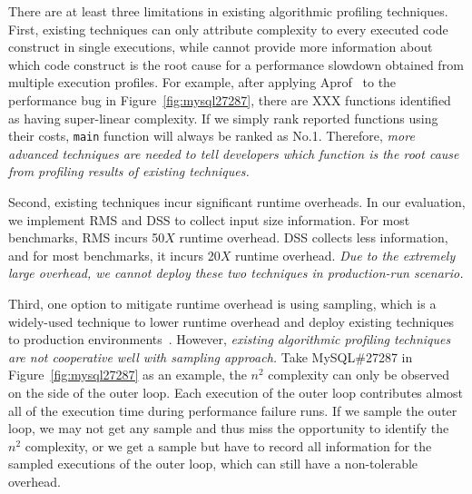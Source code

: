 %
There are at least three limitations in existing algorithmic profiling techniques. 
%
First, existing techniques can only 
attribute complexity to every executed code construct
in single executions, 
while cannot provide more information about 
which code construct is the root cause 
for a performance slowdown obtained from multiple 
execution profiles. 
For example, after applying Aprof~\cite{Aprof1,Aprof2} 
to the performance bug in Figure~\ref{fig:mysql27287}, 
there are {\color{red} XXX} functions identified 
as having super-linear complexity. 
If we simply rank reported functions using their costs, 
\texttt{main} function will always be ranked as No.1. 
Therefore, \emph{
more advanced techniques are needed to tell developers 
which function is the root cause from profiling results of existing techniques. 
}

Second, existing techniques incur significant runtime overheads. 
In our evaluation, we implement RMS and DSS to collect input size information. 
For most benchmarks, RMS incurs 50$X$ runtime overhead. 
DSS collects less information, and for most benchmarks, it incurs 20$X$ runtime overhead. 
\emph{Due to the extremely large overhead, 
we cannot deploy these two techniques in production-run scenario. }


Third, one option to mitigate runtime overhead is using
sampling, which is a widely-used technique to lower runtime overhead 
and deploy existing techniques to production 
environments~\cite{SongOOPSLA2014,liblit03,liblit05,CCI}. 
%
However, \emph{existing algorithmic profiling techniques are not cooperative well with
sampling approach.} 
Take MySQL\#27287 in Figure~\ref{fig:mysql27287} as an example,
the $n^2$ complexity can only be observed on the side of the outer loop. 
Each execution of the outer loop contributes almost all of 
the execution time during performance failure runs. 
If we sample the outer loop, 
we may not get any sample and thus miss the opportunity to 
identify the $n^2$ complexity, or we get a sample but have to 
record all 
information for the sampled executions of the outer loop, 
which can still  have a non-tolerable overhead. 
